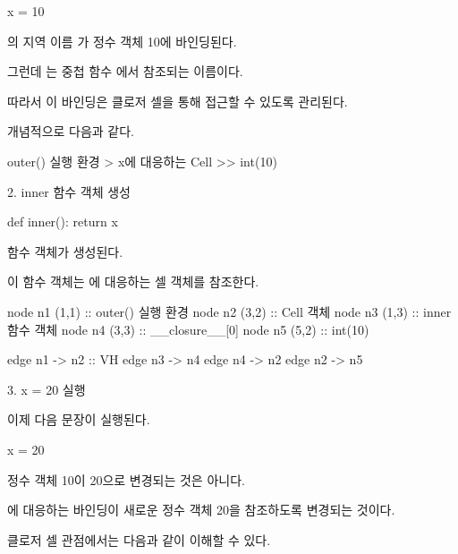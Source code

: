 \begin{dhkcode}
x = 10
\end{dhkcode}

의 지역 이름 가 정수 객체 10에 바인딩된다.

그런데 는 중첩 함수 에서 참조되는 이름이다.

따라서 이 바인딩은 클로저 셀을 통해 접근할 수 있도록 관리된다.

개념적으로 다음과 같다.

\begin{dhkdir}[in=6]
outer() 실행 환경
> x에 대응하는 Cell
>> int(10)
\end{dhkdir}

\begin{dhknote}
\begin{dhksmry}[centered]
2. inner 함수 객체 생성
\end{dhksmry}
\end{dhknote}

\begin{dhkcode}
def inner():
    return x
\end{dhkcode}

 함수 객체가 생성된다.

이 함수 객체는 에 대응하는 셀 객체를 참조한다.

\begin{dhkdiagram}[in=2]
node n1 (1,1) :: outer() 실행 환경
node n2 (3,2) :: Cell 객체
node n3 (1,3) :: inner 함수 객체
node n4 (3,3) :: __closure__[0]
node n5 (5,2) :: int(10)

edge n1 -> n2 :: VH
edge n3 -> n4 
edge n4 -> n2
edge n2 -> n5
\end{dhkdiagram}

\begin{dhknote}
\begin{dhksmry}[centered]
3. x = 20 실행
\end{dhksmry}
\end{dhknote}

이제 다음 문장이 실행된다.

\begin{dhkcode}
x = 20
\end{dhkcode}

정수 객체 10이 20으로 변경되는 것은 아니다.

에 대응하는 바인딩이 새로운 정수 객체 20을 참조하도록 변경되는 것이다.

클로저 셀 관점에서는 다음과 같이 이해할 수 있다.

